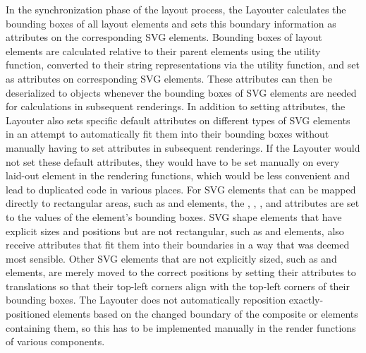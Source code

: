 In the synchronization phase of the layout process, the Layouter
calculates the bounding boxes of all layout elements and sets this
boundary information as attributes on the corresponding SVG elements.
Bounding boxes of layout elements are calculated relative to their
parent elements using the  utility
function, converted to their string representations via the
 utility function, and set as 
attributes on corresponding SVG elements.  These 
attributes can then be deserialized to  objects whenever
the bounding boxes of SVG elements are needed for calculations in
subsequent renderings.  In addition to setting 
attributes, the Layouter also sets specific default attributes on
different types of SVG elements in an attempt to automatically fit
them into their bounding boxes without manually having to set
attributes in subsequent renderings.  If the Layouter would not set
these default attributes, they would have to be set manually on every
laid-out element in the rendering functions, which would be less
convenient and lead to duplicated code in various places.  For SVG
elements that can be mapped directly to rectangular areas, such as
 and  elements, the , ,
, and  attributes are set to the values of
the element's bounding boxes.  SVG shape elements that have explicit
sizes and positions but are not rectangular, such as 
and  elements, also receive attributes that fit them into
their boundaries in a way that was deemed most sensible.  Other SVG
elements that are not explicitly sized, such as  and
 elements, are merely moved to the correct positions by
setting their  attributes to translations so that
their top-left corners align with the top-left corners of their
bounding boxes.  The Layouter does not automatically reposition
exactly-positioned elements based on the changed boundary of the
composite  or  elements containing them, so this
has to be implemented manually in the render functions of various
components.

